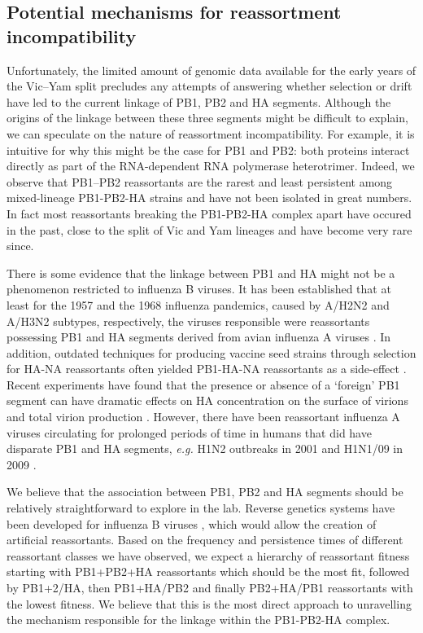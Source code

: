 \documentclass[11pt,oneside,letterpaper]{article}
\begin{document}
\subsection*{Potential mechanisms for reassortment incompatibility}
Unfortunately, the limited amount of genomic data available for the early years of the Vic--Yam split precludes any attempts of answering whether selection or drift have led to the current linkage of PB1, PB2 and HA segments.
Although the origins of the linkage between these three segments might be difficult to explain, we can speculate on the nature of reassortment incompatibility.
For example, it is intuitive for why this might be the case for PB1 and PB2: both proteins interact directly as part of the RNA-dependent RNA polymerase heterotrimer.
Indeed, we observe that PB1--PB2 reassortants are the rarest and least persistent among mixed-lineage PB1-PB2-HA strains and have not been isolated in great numbers.
In fact most reassortants breaking the PB1-PB2-HA complex apart have occured in the past, close to the split of Vic and Yam lineages and have become very rare since.

There is some evidence that the linkage between PB1 and HA might not be a phenomenon restricted to influenza B viruses.
It has been established that at least for the 1957 and the 1968 influenza pandemics, caused by A/H2N2 and A/H3N2 subtypes, respectively, the viruses responsible were reassortants possessing PB1 and HA segments derived from avian influenza A viruses \citep{kawaoka1989}.
In addition, outdated techniques for producing vaccine seed strains through selection for HA-NA reassortants often yielded PB1-HA-NA reassortants as a side-effect \citep{bergeron2010,fulvini2011}.
Recent experiments have found that the presence or absence of a `foreign' PB1 segment can have dramatic effects on HA concentration on the surface of virions and total virion production \citep{cobbin2013}.
However, there have been reassortant influenza A viruses circulating for prolonged periods of time in humans that did have disparate PB1 and HA segments, \textit{e.g.} H1N2 outbreaks in 2001 \citep{gregory2002} and H1N1/09 in 2009 \citep{smith2009}.

We believe that the association between PB1, PB2 and HA segments should be relatively straightforward to explore in the lab.
Reverse genetics systems have been developed for influenza B viruses \citep{hoffmann2002}, which would allow the creation of artificial reassortants.
Based on the frequency and persistence times of different reassortant classes we have observed, we expect a hierarchy of reassortant fitness starting with PB1+PB2+HA reassortants which should be the most fit, followed by PB1+2/HA, then PB1+HA/PB2 and finally PB2+HA/PB1 reassortants with the lowest fitness.
We believe that this is the most direct approach to unravelling the mechanism responsible for the linkage within the PB1-PB2-HA complex.
\end{document}
